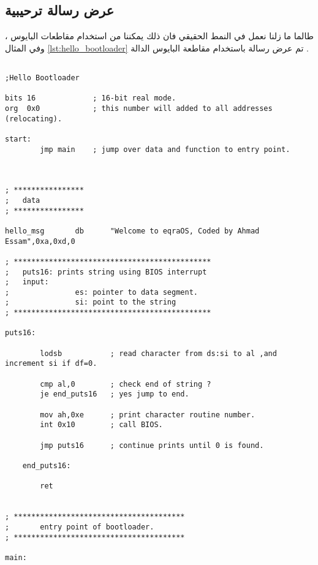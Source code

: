 \documentclass[document.tex]{subfiles}
\begin{document}
\subsection{عرض رسالة ترحيبية}
طالما ما زلنا نعمل في النمط الحقيقي فان ذلك يمكننا من استخدام مقاطعات البايوس ، وفي المثال \ref{lst:hello_bootloader} تم  عرض رسالة باستخدام مقاطعة البايوس  الدالة  . 


\begin{english}

\lstset{numberstyle=\tiny,numbersep=5pt,tabsize=2,extendedchars=true,breaklines=true,frame=b,showspaces=false, showtabs=false,xleftmargin=10pt,framexleftmargin=10pt,framexrightmargin=5pt,framexbottommargin=4pt,showstringspaces=false,language=[x86masm]Assembler}

\begin{lstlisting}[label=lst:hello_bootloader,caption=Hello\, World]

;Hello Bootloader

bits 16				; 16-bit real mode.
org	 0x0			; this number will added to all addresses (relocating).

start:
		jmp main	; jump over data and function to entry point.


		
; ****************
;	data
; ****************

hello_msg		db		"Welcome to eqraOS, Coded by Ahmad Essam",0xa,0xd,0

; *********************************************
;	puts16: prints string using BIOS interrupt
;   input:
;				es: pointer to data segment.
;				si: point to the string
; *********************************************

puts16:
		
		lodsb			; read character from ds:si to al ,and increment si if df=0.
		
		cmp al,0		; check end of string ?
		je end_puts16	; yes jump to end.
		
		mov ah,0xe		; print character routine number.
		int 0x10		; call BIOS.
		
		jmp puts16		; continue prints until 0 is found.
		
	end_puts16:
	
		ret				
		
		
; ***************************************
;		entry point of bootloader.
; ***************************************
		
main:				


\end{lstlisting}
\end{english}
\end{document}
